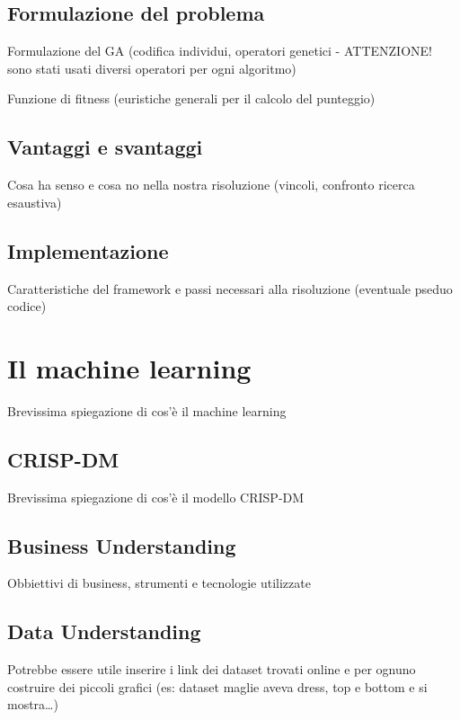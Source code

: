 \documentclass[a4paper, 11pt, oneside]{report}
\begin{document}
            \section{Formulazione del problema}
            Formulazione del GA (codifica individui, operatori genetici - ATTENZIONE! sono stati usati diversi operatori per ogni algoritmo)
            \par \noindent Funzione di fitness (euristiche generali per il calcolo del punteggio)
            \par {}

            \section{Vantaggi e svantaggi}
            Cosa ha senso e cosa no nella nostra risoluzione (vincoli, confronto ricerca esaustiva)
            \par {}

            \section{Implementazione}
            Caratteristiche del framework e passi necessari alla risoluzione (eventuale pseduo codice)

        \chapter{Il machine learning}
        Brevissima spiegazione di cos'è il machine learning

            \section{CRISP-DM}
            Brevissima spiegazione di cos'è il modello CRISP-DM
            \par {}

            \section{Business Understanding}
            Obbiettivi di business, strumenti e tecnologie utilizzate

            \section{Data Understanding}
            Potrebbe essere utile inserire i link dei dataset trovati online e per ognuno costruire dei piccoli grafici
            (es: dataset maglie aveva dress, top e bottom e si mostra\ldots)
\end{document}
